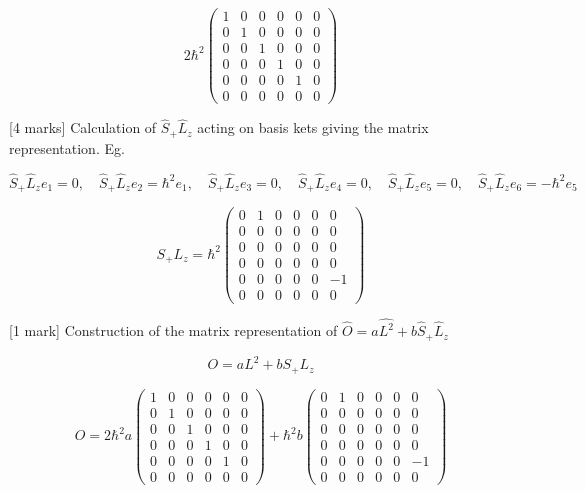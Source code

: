 \documentclass[a4paper,11pt]{article}
\begin{document}
\[ 
2\hbar^2 \begin{pmatrix} 1 & 0 & 0 & 0 & 0 & 0\\  0 & 1 & 0 & 0 & 0 & 0\\ 0 & 0 & 1 & 0 & 0 & 0\\ 0 & 0 & 0 & 1 & 0 & 0\\ 0 & 0 & 0 & 0 & 1 & 0\\ 0 & 0 & 0 & 0 & 0 & 0 \end{pmatrix}
\]

[4 marks] Calculation of \( \hat{S}_{+}\hat{L}_{z} \) acting on basis kets giving the matrix representation. Eg. 

\[
\hat{S}_{+}\hat{L}_{z}e_1 = 0, \quad \hat{S}_{+}\hat{L}_{z}e_2 = \hbar^2e_1, \quad \hat{S}_{+}\hat{L}_{z}e_3 = 0, \quad \hat{S}_{+}\hat{L}_{z}e_4 = 0, \quad \hat{S}_{+}\hat{L}_{z}e_5 = 0, \quad \hat{S}_{+}\hat{L}_{z}e_6 = -\hbar^2e_5 
\]

\[ 
S_{+}L_{z} = \hbar^2 \begin{pmatrix} 0 & 1 & 0 & 0 & 0 & 0\\ 0 & 0 & 0 & 0 & 0 & 0\\ 0 & 0 & 0 & 0 & 0 & 0\\ 0 & 0 & 0 & 0 & 0 & 0\\ 0 & 0 & 0 & 0 & 0 & -1\\ 0 & 0 & 0 & 0 & 0 & 0 \end{pmatrix}
\]

[1 mark] Construction of the matrix representation of \( \hat{O} = a\hat{L^{2}} + b\hat{S}_{+}\hat{L}_{z} \)

\[ O = a L^2 + b S_{+}L_z \]

\[
O = 2\hbar^2 a \begin{pmatrix} 1 & 0 & 0 & 0 & 0 & 0\\  0 & 1 & 0 & 0 & 0 & 0\\ 0 & 0 & 1 & 0 & 0 & 0\\ 0 & 0 & 0 & 1 & 0 & 0\\ 0 & 0 & 0 & 0 & 1 & 0\\ 0 & 0 & 0 & 0 & 0 & 0 \end{pmatrix} + \hbar^2 b \begin{pmatrix} 0 & 1 & 0 & 0 & 0 & 0\\ 0 & 0 & 0 & 0 & 0 & 0\\ 0 & 0 & 0 & 0 & 0 & 0\\ 0 & 0 & 0 & 0 & 0 & 0\\ 0 & 0 & 0 & 0 & 0 & -1\\ 0 & 0 & 0 & 0 & 0 & 0 \end{pmatrix}
\]
\end{document}
